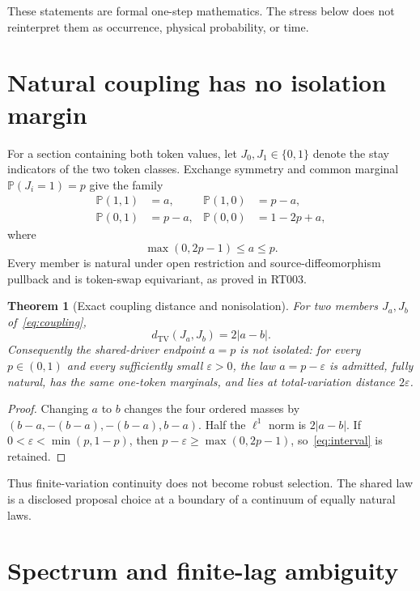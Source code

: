 \documentclass[11pt]{article}
\newtheorem{theorem}{Theorem}
\newcommand{\TV}{\operatorname{TV}}
\begin{document}
These statements are formal one-step mathematics. The stress below does not
reinterpret them as occurrence, physical probability, or time.

\section{Natural coupling has no isolation margin}

For a section containing both token values, let $J_0,J_1\in\{0,1\}$ denote
the stay indicators of the two token classes. Exchange symmetry and common
marginal $\mathbb P(J_i=1)=p$ give the family
\begin{align}
 \mathbb P(1,1)&=a,&
 \mathbb P(1,0)&=p-a,\nonumber\\
 \mathbb P(0,1)&=p-a,&
 \mathbb P(0,0)&=1-2p+a,
 \label{eq:coupling}
\end{align}
where
\begin{equation}
 \max(0,2p-1)\leq a\leq p.
 \label{eq:interval}
\end{equation}
Every member is natural under open restriction and source-diffeomorphism
pullback and is token-swap equivariant, as proved in RT003.

\begin{theorem}[Exact coupling distance and nonisolation]
For two members $J_a,J_b$ of~\eqref{eq:coupling},
\[
 d_{\TV}(J_a,J_b)=2|a-b|.
\]
Consequently the shared-driver endpoint $a=p$ is not isolated: for every
$p\in(0,1)$ and every sufficiently small $\varepsilon>0$, the law
$a=p-\varepsilon$ is admitted, fully natural, has the same one-token
marginals, and lies at total-variation distance $2\varepsilon$.
\end{theorem}

\begin{proof}
Changing $a$ to $b$ changes the four ordered masses by
$(b-a,-(b-a),-(b-a),b-a)$. Half the $\ell^1$ norm is $2|a-b|$.
If $0<\varepsilon<\min(p,1-p)$, then
$p-\varepsilon\geq\max(0,2p-1)$, so~\eqref{eq:interval} is retained.
\end{proof}

Thus finite-variation continuity does not become robust selection. The shared
law is a disclosed proposal choice at a boundary of a continuum of equally
natural laws.

\section{Spectrum and finite-lag ambiguity}
\end{document}

